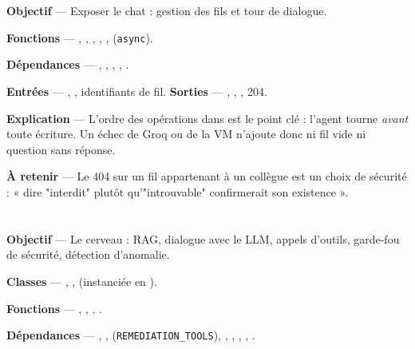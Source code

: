 \section{}

\textbf{Objectif} --- Exposer le chat : gestion des fils et tour de dialogue.

\textbf{Fonctions} --- , ,
, ,
,  (\texttt{async}).

\textbf{Dépendances} --- ,
, ,
, .

\textbf{Entrées} --- , , identifiants de
fil. \textbf{Sorties} --- , ,
, 204.

\textbf{Explication} --- L'ordre des opérations dans  est le point clé :
l'agent tourne \emph{avant} toute écriture. Un échec de Groq ou de la VM
n'ajoute donc ni fil vide ni question sans réponse.

\textbf{À retenir} --- Le 404 sur un fil appartenant à un collègue est un choix de
sécurité : « dire "interdit" plutôt qu'"introuvable" confirmerait son
existence ».

\section{}

\textbf{Objectif} --- Le cerveau : RAG, dialogue avec le LLM, appels d'outils,
garde-fou de sécurité, détection d'anomalie.

\textbf{Classes} --- , ,
 (instanciée en ).

\textbf{Fonctions} --- , ,
, .

\textbf{Dépendances} --- , ,
 (\texttt{REMEDIATION\_TOOLS}),
,
, ,
, .

